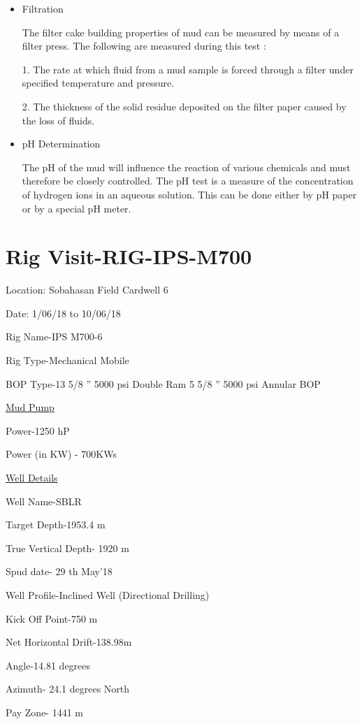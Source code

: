 \documentclass[11pt,a4paper]{article}
\begin{document}
\begin{itemize}
\item Filtration

The filter cake building properties of mud can be measured by means of a filter press. The following are measured during this test :

1. The rate at which fluid from a mud sample is forced through a filter under specified temperature and pressure.

2. The thickness of the solid residue deposited on the filter paper caused by the loss of fluids.

\item pH Determination

The pH of the mud will influence the reaction of various chemicals and must therefore be closely controlled. The pH test is a measure of the concentration of hydrogen ions in an aqueous solution. This can be done either by pH paper or by a special pH meter.

\end{itemize}
 
\section{\textbf{Rig Visit-RIG-IPS-M700}}

Location: Sobahasan Field Cardwell 6

Date: 1/06/18 to 10/06/18

Rig Name-IPS M700-6

Rig Type-Mechanical Mobile

BOP Type-13 5/8 ” 5000 psi Double Ram \hfill 5 5/8 ” 5000 psi Annular BOP

\underline{Mud Pump}

Power-1250 hP

Power (in KW) - 700KWs

\underline{Well Details}

Well Name-SBLR

Target Depth-1953.4 m

True Vertical Depth- 1920 m

Spud date- 29 th May’18

Well Profile-Inclined Well (Directional Drilling)

Kick Off Point-750 m

Net Horizontal Drift-138.98m

Angle-14.81 degrees

Azimuth- 24.1 degrees North

Pay Zone- 1441 m
\end{document}
